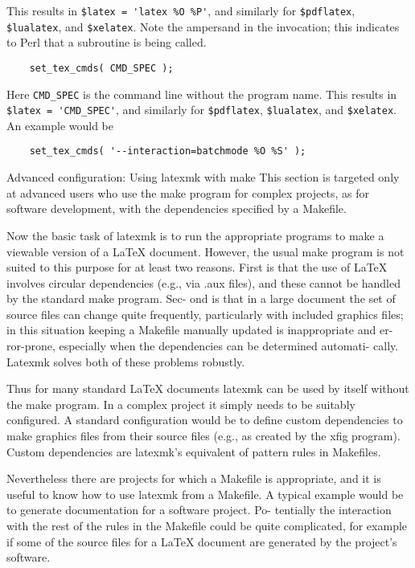 This results in \verb|$latex = 'latex %O %P'|, and  similarly  for
\verb|$pdflatex|, \verb|$lualatex|,  and  \verb|$xelatex|.   Note the ampersand
in the invocation; this indicates to Perl that a subroutine is being called.

\begin{verbatim}
	set_tex_cmds( CMD_SPEC );
\end{verbatim}

Here \verb|CMD_SPEC| is the command line without the program  name.  This  results in
\verb|$latex = 'CMD_SPEC'|, and similarly for \verb|$pdflatex|,
\verb|$lualatex|, and \verb|$xelatex|.
An example would be

\begin{verbatim}
	set_tex_cmds( '--interaction=batchmode %O %S' );
\end{verbatim}


Advanced configuration: Using latexmk with make This section is targeted only
at advanced users who use the  make  program for complex projects, as for
software development, with the dependencies specified by a Makefile.

Now the basic task of latexmk is to run  the  appropriate  programs  to make  a
viewable version of a LaTeX document.  However, the usual make program is not
suited to this purpose for at least two reasons.   First is that the use of
LaTeX involves circular dependencies (e.g., via .aux files), and these cannot
be handled by the standard make program.  Sec- ond  is  that  in  a  large
document the set of source files can change quite frequently, particularly with
included graphics  files;  in  this situation  keeping a Makefile manually
updated is inappropriate and er- ror-prone, especially when the dependencies
can be determined automati- cally.  Latexmk solves both of these problems
robustly.

Thus  for  many  standard LaTeX documents latexmk can be used by itself without
the make program. In a complex project it simply needs  to  be suitably
configured.  A standard configuration would be to define custom dependencies to
make graphics files from their source files  (e.g., as  created  by  the  xfig
program).  Custom dependencies are latexmk's equivalent of pattern rules in
Makefiles.

Nevertheless there are projects for which a  Makefile  is  appropriate,
and it is useful to know how to use latexmk from a Makefile.  A typical
example would be to generate documentation for a software project.  Po-
tentially  the  interaction  with the rest of the rules in the Makefile
could be quite complicated, for example if some of the source files for
a LaTeX document are generated by the project's software.

